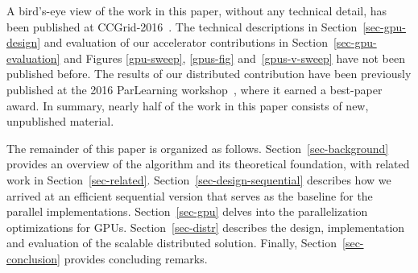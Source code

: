 \begin{comment}
Further, by cataloguing and accounting for the various load and store
operations, we identified the highest priority locations of data reuse. In
order to circumvent the unclear optimization landscape, we developed an
effective kernel code generation mechanism that explores the benefits of
exploiting all permutations of the available optimization opportunities. These
optimizations include caching in shared memory, caching in the register file,
loop unrolling and explicit vectorization.
\end{comment}

A bird's-eye view of the work in this paper, without any technical detail, has been
published at CCGrid-2016~\cite{10.1109/CCGrid.2016.98}. The technical descriptions
in Section~\ref{sec-gpu-design} and evaluation of our accelerator contributions in
Section~\ref{sec-gpu-evaluation} and Figures \ref{gpu-sweep}, \ref{gpus-fig}
and~\ref{gpus-v-sweep} have not been published before.
The results of our distributed contribution
have been previously published at the 2016 ParLearning
workshop~\cite{DBLP:conf/ipps/El-HelwHLAWB16}, where it earned a best-paper
award. In summary, nearly half of the work in this paper consists of new, unpublished
material.

The remainder of this paper is organized as follows.
Section~\ref{sec-background} provides an overview of the
algorithm and its theoretical foundation, with related work in
Section~\ref{sec-related}. Section~\ref{sec-design-sequential} describes how we
arrived at an efficient sequential version that serves as the baseline for the
parallel implementations. Section~\ref{sec-gpu} delves
into the parallelization optimizations for GPUs.
Section~\ref{sec-distr} describes the design, implementation and evaluation of
the scalable distributed solution. Finally, Section~\ref{sec-conclusion}
provides concluding remarks.




